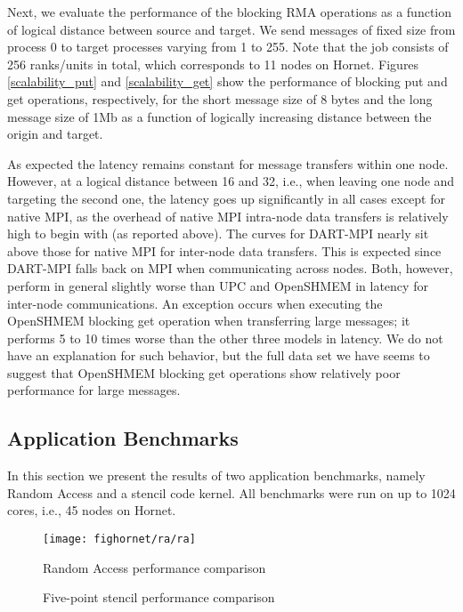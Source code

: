 \documentclass{llncs}
\begin{document}
{Next, we evaluate the performance of the blocking RMA operations as a
function of logical distance between source and target. We send
messages of fixed size from process 0 to target processes varying from
1 to 255. Note that the job consists of 256 ranks/units in
total, which corresponds to 11 nodes on Hornet. Figures
\ref{scalability_put} and \ref{scalability_get} show the performance
of blocking put and get operations, respectively, for the short
message size of 8 bytes and the long message size of 1Mb as a function
of logically increasing distance between the origin and target.

As expected the latency remains constant for message transfers within
one node. However, at a logical distance between 16 and 32, i.e., when leaving
one node and targeting the second one, the latency goes up significantly in
all cases except for native MPI, as the overhead of native MPI intra-node data transfers
is relatively high to begin with (as reported above). The
curves for DART-MPI nearly sit above those for native MPI for inter-node data transfers.
This is expected since DART-MPI falls back on
MPI when communicating across nodes. Both, however, perform in general slightly worse than
UPC and OpenSHMEM in latency for inter-node communications. An exception occurs when executing the
OpenSHMEM blocking get operation when transferring large messages; it
performs 5 to 10 times worse than the other three models in latency. We do not have
an explanation for such behavior, but the full data set we have seems
to suggest that OpenSHMEM blocking get operations show relatively poor 
performance for large messages.

\subsection{Application Benchmarks}
In this section we present the results of two application benchmarks,
namely Random Access and a stencil code kernel. All benchmarks were run on up to
1024 cores, i.e., 45 nodes on Hornet.  

\begin{figure}[tbp]
\begin{center}
\texttt{[image: fighornet/ra/ra]}
\end{center} 
\caption{Random Access performance comparison}
\label{ra}
\end{figure}
\begin{figure}[tbp]
\begin{center}
\end{center} 
\caption{Five-point stencil performance comparison}
\label{2DPoisson}
\end{figure}

}
\end{document}
